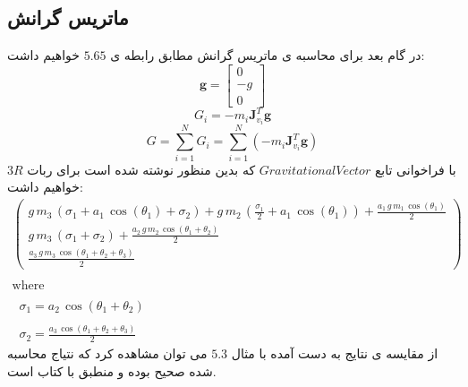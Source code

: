 \subsection*{ماتریس گرانش}
در گام بعد برای محاسبه ی ماتریس گرانش مطابق رابطه ی $5.65$ خواهیم داشت:
\[
\mathbf{g} = \begin{bmatrix} 0 \\ -g \\ 0 \end{bmatrix}
\]
\[
G_i = -m_i \mathbf{J}_{v_i}^T \mathbf{g}
\]
\[
G = \sum_{i=1}^{N} G_i = \sum_{i=1}^{N} \left( -m_i \mathbf{J}_{v_i}^T \mathbf{g} \right)
\]
با فراخوانی تابع
 $GravitationalVector$
  که بدین منظور نوشته شده است برای ربات $3R$ خواهیم داشت:
\[
\begin{array}{l}
	\left(\begin{array}{c}
		g\,m_3 \,{\left(\sigma_1 +a_1 \,\cos \left(\theta_1 \right)+\sigma_2 \right)}+g\,m_2 \,{\left(\frac{\sigma_1 }{2}+a_1 \,\cos \left(\theta_1 \right)\right)}+\frac{a_1 \,g\,m_1 \,\cos \left(\theta_1 \right)}{2}\\
		g\,m_3 \,{\left(\sigma_1 +\sigma_2 \right)}+\frac{a_2 \,g\,m_2 \,\cos \left(\theta_1 +\theta_2 \right)}{2}\\
		\frac{a_3 \,g\,m_3 \,\cos \left(\theta_1 +\theta_2 +\theta_3 \right)}{2}
	\end{array}\right)\\
	\mathrm{}\\
	\textrm{where}\\
	\mathrm{}\\
	\;\;\sigma_1 =a_2 \,\cos \left(\theta_1 +\theta_2 \right)\\
	\mathrm{}\\
	\;\;\sigma_2 =\frac{a_3 \,\cos \left(\theta_1 +\theta_2 +\theta_3 \right)}{2}
\end{array}
\]
از مقایسه ی نتایج به دست آمده با مثال $5.3$ می توان مشاهده کرد که نتیاج محاسبه شده صحیح بوده و منطبق با کتاب است. 
